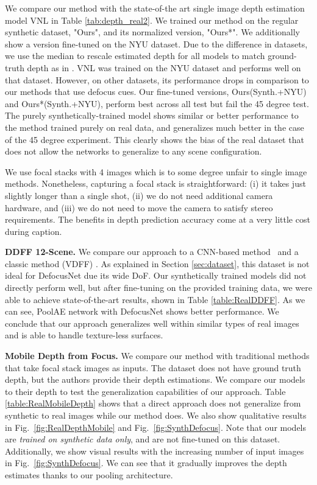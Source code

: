 \documentclass[10pt,twocolumn,letterpaper]{article}
\begin{document}
We compare our method with the state-of-the art single image depth estimation model VNL \cite{Yin_2019_ICCV} in Table \ref{tab:depth_real2}.
We trained our method on the regular synthetic dataset, "Ours", and its normalized version, "Ours*". We additionally show a version fine-tuned on the NYU dataset.
 Due to the difference in datasets, we use the median to rescale estimated depth for all models to match ground-truth depth as in \cite{Gordon19}.
VNL was trained on the NYU dataset and performs well on that dataset. However, on other datasets, its performance drops in comparison to our methods that use defocus cues.
Our fine-tuned versions, Ours(Synth.+NYU) and Ours*(Synth.+NYU), perform best across all test but fail the 45 degree test.  
The purely synthetically-trained model shows similar or better performance to the method trained purely on real data, and generalizes much better in the case of the 45 degree experiment.
This clearly shows the bias of the real dataset that does not allow the networks to generalize to any scene configuration. 

We use focal stacks with 4 images which is to some degree unfair to single image methods. Nonetheless, capturing a focal stack is straightforward: (i) it takes just slightly longer than a single shot, (ii) we do not need additional camera hardware, and (iii) we do not need to move the camera to satisfy stereo requirements. 
The benefits in depth prediction accuracy come at a very little cost during caption.


\noindent\textbf{DDFF 12-Scene.} We compare our approach 
to a CNN-based method~\cite{Hazirbas18} and a classic method (VDFF) \cite{Moeller2015}.
As explained in Section \ref{sec:dataset}, this dataset is not ideal for DefocusNet due its wide DoF. 
Our synthetically trained models did not directly perform well, but after fine-tuning on the provided training data, we were able to achieve state-of-the-art results, shown in Table \ref{table:RealDDFF}. 
As we can see, PoolAE network with DefocusNet shows better performance. We conclude that our approach generalizes well within similar types of real images and is able to handle texture-less surfaces.

\noindent\textbf{Mobile Depth from Focus.}
We compare our method with traditional methods \cite{Suwajanakorn15} that take focal stack images as inputs. The dataset does not have ground truth depth, but the authors provide their depth estimations. We compare our models to their depth to test the generalization capabilities of our approach. Table \ref{table:RealMobileDepth} shows that a direct approach does not generalize from synthetic to real images while our method does.
We also show qualitative results in Fig.~\ref{fig:RealDepthMobile} and Fig.~\ref{fig:SynthDefocus}. Note that our models are {\it trained on synthetic data only}, and are not fine-tuned on this dataset. 
Additionally, we show visual results with the increasing number of input images in Fig.~\ref{fig:SynthDefocus}. We can see that it gradually improves the depth estimates thanks to our pooling architecture.
\end{document}
